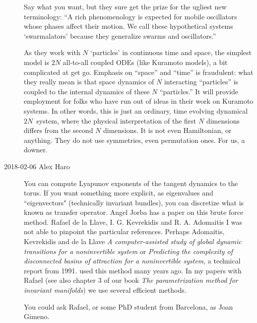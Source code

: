 \begin{description}
{Say what you want, but they sure get the prize for the ugliest new
terminology: ``A rich phenomenology is expected for mobile oscillators whose
phases affect their motion. We call these hypothetical systems `swarmalators'
because they generalize swarms and oscillators.''

As they work with $N$ `particles' in continuous time and space, the simplest
model is $2N$ all-to-all coupled ODEs (like Kuramoto models), a bit
complicated at get go. Emphasis on ``space'' and ``time'' is fraudulent: what
they really mean is that space dynamics of $N$ interacting ``particles'' is
coupled to the internal dynamics of these $N$ ``particles.'' It will provide
employment for folks who have run out of ideas in their work on Kuramoto
systems. In other words, this is just an ordinary, time evolving dynamical
$2N$\dmn\ system, where the physical interpretation of the first $N$
dimensions differs from the second $N$ dimensions. It is not even
Hamiltonian, or anything. They do not use symmetries, even permutation ones.
For us, a downer.
    }

\item[2018-02-06 Alex Haro]
You can compute Lyapunov exponents of the tangent dynamics to the torus.
If you want something more explicit, as eigenvalues and ``eigenvectors"
(technically invariant bundles), you can discretize what is known as
transfer operator. Angel Jorba has a paper on this brute force method.
Rafael de la Llave, I. G. Kevrekidis and R. A. Adomaitis
{
I was not able to pinpoint the particular references. Perhaps
Adomaitis, Kevrekidis and de la Llave
{\em A computer-assisted study of global dynamic transitions for a
noninvertible system}
or
{\em Predicting the complexity of disconnected basins of attraction for a
noninvertible system}, a technical report from 1991.
}
used this method many years ago.
In my papers with Rafael (see also chapter 3 of our book {\em The
parametrization method for invariant manifolds}) we use several efficient
methods.

You could ask Rafael, or some PhD student from Barcelona, as Joan Gimeno.



\end{description}
